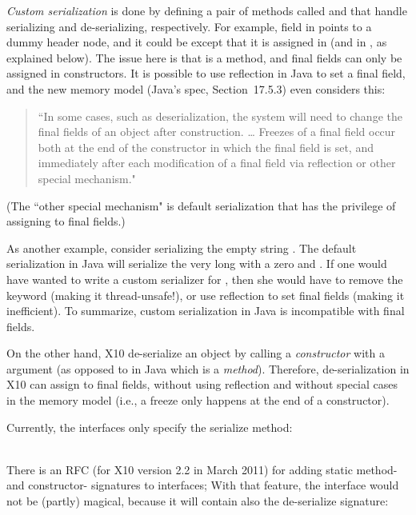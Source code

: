 \emph{Custom serialization} is done by defining a pair of methods called
     and 
    that handle serializing and de-serializing, respectively.
For example, field  in  points to a dummy header node,
    and it could be  except that it is assigned in 
    (and in , as explained below).
The issue here is that  is a method,
    and final fields can only be assigned in
    constructors.
It is possible to use reflection in Java to set a final field,
    and the new memory model (Java's spec, Section~17.5.3)
    even considers this:
\begin{quote}
``In some cases, such as deserialization, the system will need to change
    the final fields of an object after construction.
\ldots
Freezes of a final field occur both at the end of the constructor in which the final field is set,
    and immediately after each modification of a final field via reflection or other special mechanism."
\end{quote}
(The ``other special mechanism" is default serialization that has the privilege of assigning to final fields.)

As another example, consider serializing the empty string .
The default serialization in Java will serialize the very long  with a zero  and .
If one would have wanted to write a custom serializer for ,
    then she would have to remove the  keyword (making it thread-unsafe!),
    or use reflection to set final fields (making it inefficient).
To summarize, custom serialization in Java is incompatible with final fields.

On the other hand, X10 de-serialize an object by calling a \emph{constructor} with a 
    argument (as opposed to  in Java which is a \emph{method}).
Therefore, de-serialization in X10 can assign to final fields, without using reflection
    and without special cases in the memory model (i.e., a freeze only happens at the end of a constructor).

Currently, the  interfaces only specify the serialize method:

~~~~~~~~\\
There is an RFC (for X10 version 2.2 in March 2011) for adding static method- and constructor- signatures to interfaces;
    With that feature, the  interface would not be (partly) magical,
    because it will contain also the de-serialize signature:

